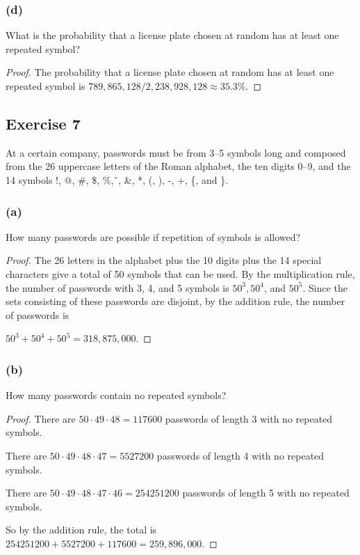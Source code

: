 \documentclass[14pt]{extarticle}
\begin{document}
\subsubsection{(d)}
What is the probability that a license plate chosen at random has at least one repeated symbol?

\begin{proof}
     The probability that a license plate chosen at random has at least one repeated symbol is
     \(789,865,128 / 2,238,928,128 \approx 35.3\%\).
\end{proof}

\subsection{Exercise 7}
At a certain company, passwords must be from 3–5 symbols long and composed from the 26 uppercase letters of the
Roman alphabet, the ten digits 0–9, and the 14 symbols !, @, \#, \$, \%, \^\,, \&, *, (, ), -, +, \{, and \}.

\subsubsection{(a)}
How many passwords are possible if repetition of symbols is allowed?

\begin{proof}
     The 26 letters in the alphabet plus the 10 digits plus the 14 special characters give a total of 50 symbols that can
     be used. By the multiplication rule, the number of passwords with 3, 4, and 5 symbols is \(50^3, 50^4\), and
     \(50^5\). Since the sets consisting of these passwords are disjoint, by the addition rule, the number of passwords is

     \(50^3 + 50^4 + 50^5 = 318,875,000\).
\end{proof}

\subsubsection{(b)}
How many passwords contain no repeated symbols?

\begin{proof}
     There are \(50 \cdot 49 \cdot 48 = 117600\) passwords of length 3 with no repeated symbols.

     There are \(50 \cdot 49 \cdot 48 \cdot 47 = 5527200\) passwords of length 4 with no repeated symbols.

     There are \(50 \cdot 49 \cdot 48 \cdot 47 \cdot 46 = 254251200\) passwords of length 5 with no repeated symbols.

     So by the addition rule, the total is \(254251200 + 5527200 + 117600 = 259,896,000\).
\end{proof}
\end{document}
